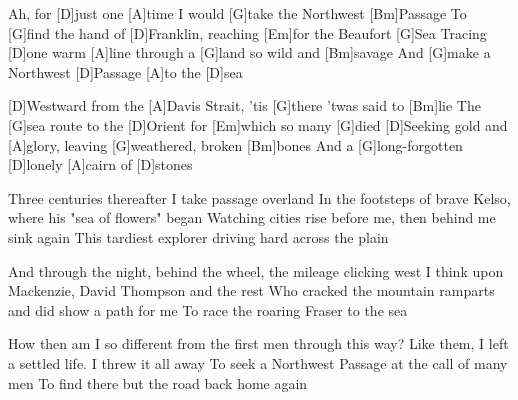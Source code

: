 

\begin{guitar}
	Ah, for [D]just one [A]time I would [G]take the Northwest [Bm]Passage
	To [G]find the hand of [D]Franklin, reaching [Em]for the Beaufort [G]Sea
	Tracing [D]one warm [A]line through a [G]land so wild and [Bm]savage
	And [G]make a Northwest [D]Passage [A]to the [D]sea
	
	[D]Westward from the [A]Davis Strait, 'tis [G]there 'twas said to [Bm]lie
	The [G]sea route to the [D]Orient for [Em]which so many [G]died
	[D]Seeking gold and [A]glory, leaving [G]weathered, broken [Bm]bones
	And a [G]long-forgotten [D]lonely [A]cairn of [D]stones
	
	 
	
	Three centuries thereafter I take passage overland
	In the footsteps of brave Kelso, where his "sea of flowers" began
	Watching cities rise before me, then behind me sink again
	This tardiest explorer driving hard across the plain
	
	 
	
	And through the night, behind the wheel, the mileage clicking west
	I think upon Mackenzie, David Thompson and the rest
	Who cracked the mountain ramparts and did show a path for me
	To race the roaring Fraser to the sea
	
	 
	
	How then am I so different from the first men through this way?
	Like them, I left a settled life. I threw it all away
	To seek a Northwest Passage at the call of many men
	To find there but the road back home again
	
	 
\end{guitar}